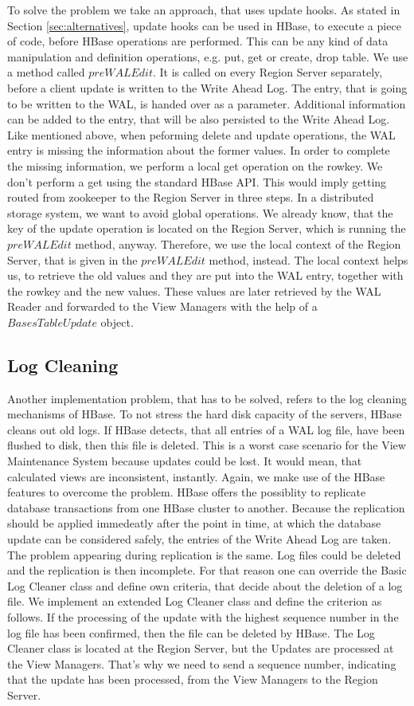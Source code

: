 \documentclass[11pt,a4paper,bibtotoc,idxtotoc,headsepline,footsepline,footexclude,BCOR12mm,DIV13]{scrbook}
\begin{document}
To solve the problem we take an approach, that uses update hooks. As stated in Section \ref{sec:alternatives}, update hooks can be used in HBase, to execute a piece of code, before HBase operations are performed. This can be any kind of data manipulation and definition operations, e.g. put, get or create, drop table.  We use a method called $preWALEdit$. It is called on every Region Server separately, before a client update is written to the Write Ahead Log. The entry, that is going to be written to the WAL, is handed over as a parameter. Additional information can be added to the entry, that will be also persisted to the Write Ahead Log. Like mentioned above, when peforming delete and update operations, the WAL entry is missing the information about the former values. In order to complete the missing information, we perform a local get operation on the rowkey. We don't perform a get using the standard HBase API. This would imply getting routed from zookeeper to the Region Server in three steps. In a distributed storage system, we want to avoid global operations. We already know, that the key of the update operation is located on the Region Server, which is running the $preWALEdit$ method, anyway. Therefore, we use the local context of the Region Server, that is given in the $preWALEdit$ method, instead. The local context helps us, to retrieve the old values and they are put into the WAL entry, together with the rowkey and the new values. These values are later retrieved by the WAL Reader and forwarded to the View Managers with the help of a $BasesTableUpdate$ object.


\subsection{Log Cleaning}
Another implementation problem, that has to be solved, refers to the log cleaning mechanisms of HBase. To not stress the hard disk capacity of the servers, HBase cleans out old logs. If HBase detects, that all entries of a WAL log file, have been flushed to disk, then this file is deleted. This is a worst case scenario for the View Maintenance System because updates could be lost. It would mean, that calculated views are inconsistent, instantly. Again, we make use of the HBase features to overcome the problem. HBase offers the possiblity to replicate database transactions from one HBase cluster to another. Because the replication should be applied immedeatly after the point in time, at which the database update can be considered safely, the entries of the Write Ahead Log are taken. The problem appearing during replication is the same. Log files could be deleted and the replication is then incomplete. For that reason one can override the Basic Log Cleaner class and define own criteria,  that decide about the deletion of a log file. We implement an extended Log Cleaner class and define the criterion as follows. If the processing of the update with the highest sequence number in the log file has been confirmed, then the file can be deleted by HBase. The Log Cleaner class is located at the Region Server, but the Updates are processed at the View Managers. That's why we need to send a sequence number, indicating that the update has been processed, from the View Managers to the Region Server. 
\end{document}
